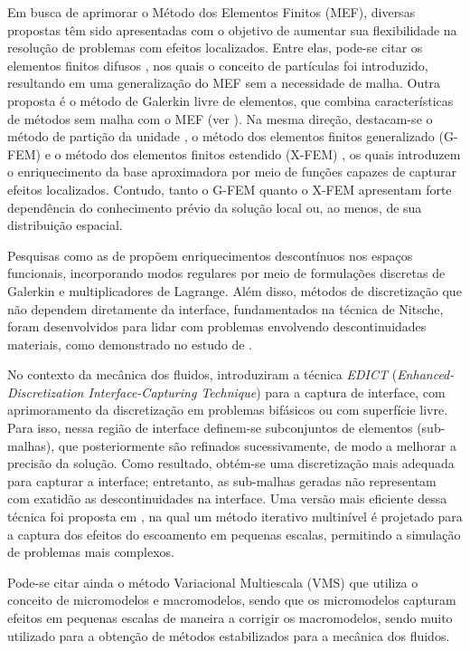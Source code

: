 Em busca de aprimorar o Método dos Elementos Finitos (MEF), diversas propostas têm sido apresentadas com o objetivo de aumentar sua flexibilidade na resolução de problemas com efeitos localizados. Entre elas, pode-se citar os elementos finitos difusos \cite{NayrolesTV:1992}, nos quais o conceito de partículas foi introduzido, resultando em uma generalização do MEF sem a necessidade de malha. Outra proposta é o método de Galerkin livre de elementos, que combina características de métodos sem malha com o MEF (ver ). Na mesma direção, destacam-se o método de partição da unidade \cite{MelenkB:1996}, o método dos elementos finitos generalizado (G-FEM) \cite{StrouboulisCB:2001} e o método dos elementos finitos estendido (X-FEM) \cite{Moes:2003}, os quais introduzem o enriquecimento da base aproximadora por meio de funções capazes de capturar efeitos localizados. Contudo, tanto o G-FEM quanto o X-FEM apresentam forte dependência do conhecimento prévio da solução local ou, ao menos, de sua distribuição espacial.

Pesquisas como as de  propõem enriquecimentos descontínuos nos espaços funcionais, incorporando modos regulares por meio de formulações discretas de Galerkin e multiplicadores de Lagrange. Além disso, métodos de discretização que não dependem diretamente da interface, fundamentados na técnica de Nitsche, foram desenvolvidos para lidar com problemas envolvendo descontinuidades materiais, como demonstrado no estudo de .

No contexto da mecânica dos fluidos,  introduziram a técnica \textit{EDICT} (\textit{Enhanced-Discretization Interface-Capturing Technique}) para a captura de interface, com aprimoramento da discretização em problemas bifásicos ou com superfície livre. Para isso, nessa região de interface definem-se subconjuntos de elementos (sub-malhas), que posteriormente são refinados sucessivamente, de modo a melhorar a precisão da solução. Como resultado, obtém-se uma discretização mais adequada para capturar a interface; entretanto, as sub-malhas geradas não representam com exatidão as descontinuidades na interface. Uma versão mais eficiente dessa técnica foi proposta em , na qual um método iterativo multinível é projetado para a captura dos efeitos do escoamento em pequenas escalas, permitindo a simulação de problemas mais complexos.

Pode-se citar ainda o método Variacional Multiescala (VMS) \cite{Hughesetal:1998} que utiliza o conceito de micromodelos e macromodelos, sendo que os micromodelos capturam efeitos em pequenas escalas de maneira a corrigir os macromodelos, sendo muito utilizado para a obtenção de métodos estabilizados para a mecânica dos fluidos.

